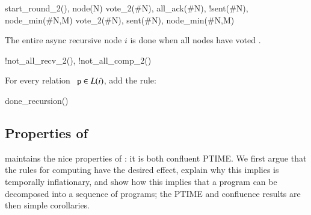 \begin{Drules}
      {start_round_2(), node(N)}
      {vote_2(#N), all_ack(#N), !sent(#N), node_min(#N,M)}
      {vote_2(#N), sent(#N), node_min(#N,M)}
\end{Drules}

The entire async recursive node $i$ is done when all nodes have voted .

\begin{Drules}
      {!not_all_recv_2(), !not_all_comp_2()}
\end{Drules}

For every relation $\dedalus{p} \in L(i)$, add the rule:

\begin{Drules}
      {done_recursion()}
\end{Drules}

\subsection{Properties of \plang}
\plang maintains the nice properties of \slang: it is both confluent PTIME.  We first argue that the rules for computing  have the desired effect, explain why this implies \plang is temporally inflationary, and show how this implies that a \plang program can be decomposed into a sequence of \slang programs; the PTIME and confluence results are then simple corollaries.

